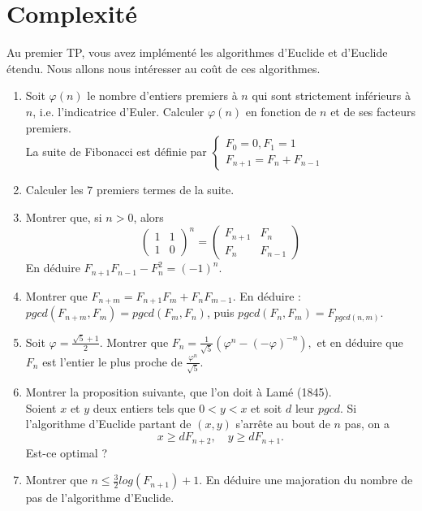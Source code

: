 \section{Complexité}

Au premier TP, vous avez implémenté les algorithmes d'Euclide et d'Euclide étendu. 
Nous allons nous intéresser au coût de ces algorithmes.

\begin{enumerate}
\item Soit $\varphi(n)$ le nombre d'entiers premiers à $n$ qui sont strictement inférieurs à $n$, i.e. l'indicatrice d'Euler. Calculer $\varphi(n)$ en fonction de $n$ et de ses facteurs premiers.\\

La suite de Fibonacci est définie par 
$\left\{\begin{array}{c} F_0 = 0, F_1 = 1\\
F_{n+1}=F_n+F_{n-1}\end{array}\right.$

\item Calculer les $7$ premiers termes de la suite.
\item Montrer que, si $n>0$, alors 
\[\begin{pmatrix}1 & 1 \\ 1 & 0\end{pmatrix}^n = \begin{pmatrix}F_{n+1} & F_n \\ F_n & F_{n-1}\end{pmatrix}\]
En déduire $F_{n+1}F_{n-1}-F_n^2 = (-1)^n$.
\item Montrer que $F_{n+m} = F_{n+1}F_m+F_n F_{m-1}$. En déduire : $pgcd(F_{n+m},F_m)= pgcd(F_m,F_n)$, puis $pgcd(F_n,F_m)=F_{pgcd(n,m)}$.
\item Soit $\varphi = \frac{\sqrt{5}+1}{2}$. Montrer que 
$F_n= \frac{1}{\sqrt{5}}(\varphi^n-(-\varphi)^{-n}),$
et en déduire que $F_n$ est l'entier le plus proche de $\frac{\varphi^n}{\sqrt 5}$.
\item Montrer la proposition suivante, que l'on doit à Lamé (1845). \\
Soient $x$ et $y$ deux entiers tels que $0<y<x$ et soit $d$ leur $pgcd$. Si l'algorithme d'Euclide partant de $(x,y)$ s'arrête au bout de $n$ pas, on a 
\[x \geq d F_{n+2}, \quad y \geq d F_{n+1}.\]
Est-ce optimal ?
\item Montrer que $n\leq \frac{3}{2} log (F_{n+1})+1$. En déduire une majoration du nombre de pas de l'algorithme d'Euclide.\\


\end{enumerate}
